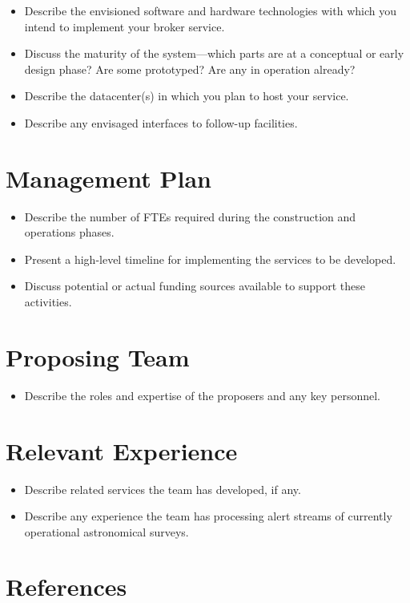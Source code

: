 \documentclass[11pt, letterpaper]{article}
\begin{document}
\begin{itemize}
\item Describe the envisioned software and hardware technologies with which you intend to implement your broker service.
\item Discuss the maturity of the system---which parts are at a conceptual or early design phase?  Are some prototyped? Are any in operation already?
\item Describe the datacenter(s) in which you plan to host your service.
\item Describe any envisaged interfaces to follow-up facilities.
\end{itemize}

	
\section{Management Plan}

\begin{itemize}
\item Describe the number of FTEs required during the construction and operations phases.
\item Present a high-level timeline for implementing the services to be developed.
\item Discuss potential or actual funding sources available to support these activities.	
\end{itemize}


\section{Proposing Team}

\begin{itemize}
\item Describe the roles and expertise of the proposers and any key personnel.
\end{itemize}

\section{Relevant Experience}

\begin{itemize}
\item Describe related services the team has developed, if any.
\item Describe any experience the team has processing alert streams of currently operational astronomical surveys. 
\end{itemize}

\section{References}
\end{document}
